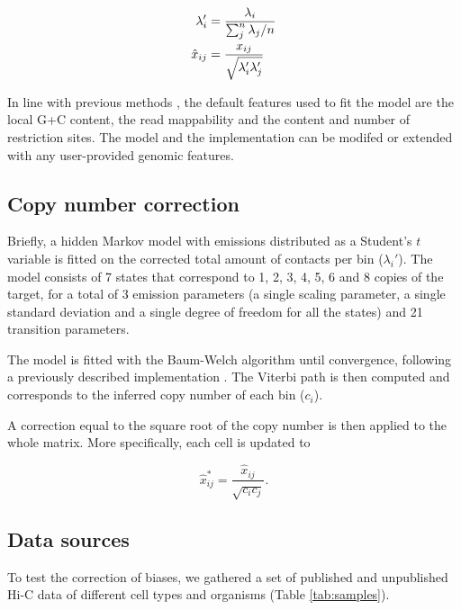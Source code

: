 \documentclass{article}
\begin{document}
\begin{align}
\notag
\lambda_i' &= \frac{\lambda_i}{\sum_j^n{\lambda_j}/n} \\
\label{eq:xhat}
\hat{x}_{ij} &= \frac{x_{ij}}{\sqrt{\lambda_i'\lambda_j'}}
\end{align}

In line with previous methods
\citep{yaffe2011probabilistic,hu2012hicnorm}, the default features
used to fit the model are the local G+C content, the read mappability and
the content and number of restriction sites. The model and the
implementation can be modifed or extended with any user-provided genomic
features.

\subsection{Copy number correction}
\label{sec:hmm}

Briefly, a hidden Markov model with emissions distributed as a Student's
$t$ variable is fitted on the corrected total amount of contacts per bin
($\lambda_i'$). The model consists of 7 states that correspond to 1, 2,
3, 4, 5, 6 and 8 copies of the target, for a total of 3 emission
parameters (a single scaling parameter, a single standard deviation and a
single degree of freedom for all the states) and 21 transition parameters. 

The model is fitted with the Baum-Welch algorithm \citep{baum1966} until
convergence, following a previously described implementation
\citep{filion2010systematic}.  The Viterbi path is then computed and
corresponds to the inferred copy number of each bin ($c_i$).

A correction equal to the square root of the copy number is then applied
to the whole matrix. More specifically, each cell is updated to


\begin{equation}
\label{eq:cnvnorm}
\hat{x}_{ij}^* = \frac{\hat{x}_{ij}}{\sqrt{c_ic_j}}.
\end{equation}

\subsection{Data sources}

To test the correction of biases, we gathered a set of
published \citep{ledily2014distinct, encode2012integrated, rao20143d,
stadhouders2017transcription, lin2012global, dixon2012topological} and
unpublished Hi-C data of different cell types and organisms
(Table \ref{tab:samples}).
\end{document}
